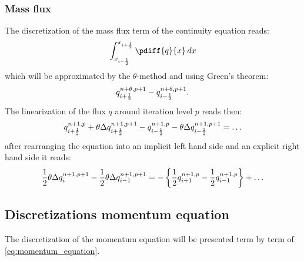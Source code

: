 \subsubsection{Mass flux}
The discretization of the mass flux term of the continuity equation reads:
\begin{align}
    \int^{x_{i+\half}}_{x_{i-\half}} \pdiff{q}{x} \,dx
\end{align}
which will be approximated by the $\theta$-method and using Green's theorem:
\begin{align}
q^{n+\theta, p+1}_{i+\frac{1}{2}} - q^{n+\theta, p+1}_{i-\frac{1}{2}}.
\end{align}
The linearization of the flux $q$ around iteration level $p$ reads then:
\begin{align}
    q^{n+1,p}_{i+\frac{1}{2}}  + \theta \Delta q^{n+1, p+1}_{i+\frac{1}{2}}
    - q^{n+1,p}_{i-\frac{1}{2}}  - \theta \Delta q^{n+1, p+1}_{i-\frac{1}{2}} = \ldots
\end{align}
after rearranging the equation into an implicit left hand side and an explicit right hand side  it reads:
\begin{align}
\frac{1}{2}  \theta \Delta q^{n+1, p+1}_{i} - \frac{1}{2} \theta \Delta q^{n+1, p+1}_{i-1} = -\left\{ \frac{1}{2} q^{n+1,p}_{i+1}  - \frac{1}{2} q^{n+1,p}_{i-1} \right\} + \ldots
\end{align}

\subsection{Discretizations momentum equation}
The discretization of the momentum equation will be presented term by term of \autoref{eq:momentum_equation}.
